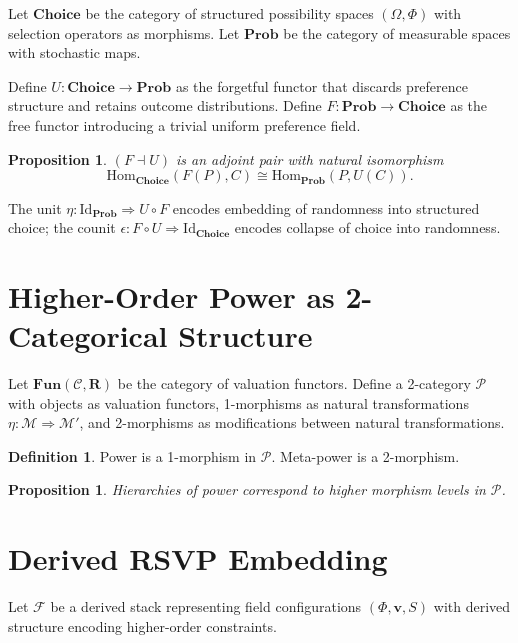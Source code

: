 \documentclass[11pt,a4paper]{article}
\newtheorem{proposition}[theorem]{Proposition}
\theoremstyle{definition}
\newtheorem{definition}[theorem]{Definition}
\theoremstyle{remark}
\begin{document}
Let $\mathbf{Choice}$ be the category of structured possibility spaces $(\Omega, \Phi)$ with selection operators as morphisms. Let $\mathbf{Prob}$ be the category of measurable spaces with stochastic maps.

Define $U : \mathbf{Choice} \to \mathbf{Prob}$ as the forgetful functor that discards preference structure and retains outcome distributions. Define $F : \mathbf{Prob} \to \mathbf{Choice}$ as the free functor introducing a trivial uniform preference field.

\begin{proposition}
$(F \dashv U)$ is an adjoint pair with natural isomorphism
\[
\mathrm{Hom}_{\mathbf{Choice}}(F(P), C) \cong \mathrm{Hom}_{\mathbf{Prob}}(P, U(C)).
\]
\end{proposition}

The unit $\eta : \mathrm{Id}_{\mathbf{Prob}} \Rightarrow U \circ F$ encodes embedding of randomness into structured choice; the counit $\epsilon : F \circ U \Rightarrow \mathrm{Id}_{\mathbf{Choice}}$ encodes collapse of choice into randomness.

\section{Higher-Order Power as 2-Categorical Structure}

Let $\mathbf{Fun}(\mathcal{C}, \mathbf{R})$ be the category of valuation functors. Define a 2-category $\mathcal{P}$ with objects as valuation functors, 1-morphisms as natural transformations $\eta : \mathcal{M} \Rightarrow \mathcal{M}'$, and 2-morphisms as modifications between natural transformations.

\begin{definition}
Power is a 1-morphism in $\mathcal{P}$. Meta-power is a 2-morphism.
\end{definition}

\begin{proposition}
Hierarchies of power correspond to higher morphism levels in $\mathcal{P}$.
\end{proposition}

\section{Derived RSVP Embedding}

Let $\mathcal{F}$ be a derived stack representing field configurations $(\Phi, \mathbf{v}, S)$ with derived structure encoding higher-order constraints.
\end{document}
